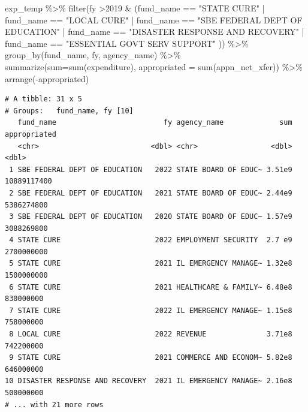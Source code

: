\documentclass[
  letterpaper,
  DIV=11,
  numbers=noendperiod]{scrreport}
\newenvironment{Shaded}{\begin{snugshade}}{\end{snugshade}}
\newcommand{\AttributeTok}[1]{\textcolor[rgb]{0.40,0.45,0.13}{#1}}
\newcommand{\DecValTok}[1]{\textcolor[rgb]{0.68,0.00,0.00}{#1}}
\newcommand{\FunctionTok}[1]{\textcolor[rgb]{0.28,0.35,0.67}{#1}}
\newcommand{\NormalTok}[1]{\textcolor[rgb]{0.00,0.23,0.31}{#1}}
\newcommand{\SpecialCharTok}[1]{\textcolor[rgb]{0.37,0.37,0.37}{#1}}
\newcommand{\StringTok}[1]{\textcolor[rgb]{0.13,0.47,0.30}{#1}}
\begin{document}
\begin{Shaded}
\begin{Highlighting}[]
\NormalTok{exp\_temp }\SpecialCharTok{\%\textgreater{}\%} \FunctionTok{filter}\NormalTok{(fy }\SpecialCharTok{\textgreater{}}\DecValTok{2019} \SpecialCharTok{\&}\NormalTok{ (fund\_name }\SpecialCharTok{==} \StringTok{"STATE CURE"} \SpecialCharTok{|}\NormalTok{ fund\_name }\SpecialCharTok{==} \StringTok{"LOCAL CURE"} \SpecialCharTok{|}\NormalTok{ fund\_name }\SpecialCharTok{==} \StringTok{"SBE FEDERAL DEPT OF EDUCATION"} \SpecialCharTok{|}\NormalTok{ fund\_name }\SpecialCharTok{==} \StringTok{"DISASTER RESPONSE AND RECOVERY"} \SpecialCharTok{|}\NormalTok{ fund\_name }\SpecialCharTok{==} \StringTok{"ESSENTIAL GOVT SERV SUPPORT"}\NormalTok{ )) }\SpecialCharTok{\%\textgreater{}\%} 
  \FunctionTok{group\_by}\NormalTok{(fund\_name, fy, agency\_name) }\SpecialCharTok{\%\textgreater{}\%} 
  \FunctionTok{summarize}\NormalTok{(}\AttributeTok{sum=}\FunctionTok{sum}\NormalTok{(expenditure),}
            \AttributeTok{appropriated =} \FunctionTok{sum}\NormalTok{(appn\_net\_xfer)) }\SpecialCharTok{\%\textgreater{}\%} 
  \FunctionTok{arrange}\NormalTok{(}\SpecialCharTok{{-}}\NormalTok{appropriated)}
\end{Highlighting}
\end{Shaded}

\begin{verbatim}
# A tibble: 31 x 5
# Groups:   fund_name, fy [10]
   fund_name                         fy agency_name             sum appropriated
   <chr>                          <dbl> <chr>                 <dbl>        <dbl>
 1 SBE FEDERAL DEPT OF EDUCATION   2022 STATE BOARD OF EDUC~ 3.51e9  10889117400
 2 SBE FEDERAL DEPT OF EDUCATION   2021 STATE BOARD OF EDUC~ 2.44e9   5386274800
 3 SBE FEDERAL DEPT OF EDUCATION   2020 STATE BOARD OF EDUC~ 1.57e9   3088269800
 4 STATE CURE                      2022 EMPLOYMENT SECURITY  2.7 e9   2700000000
 5 STATE CURE                      2021 IL EMERGENCY MANAGE~ 1.32e8   1500000000
 6 STATE CURE                      2021 HEALTHCARE & FAMILY~ 6.48e8    830000000
 7 STATE CURE                      2022 IL EMERGENCY MANAGE~ 1.15e8    758000000
 8 LOCAL CURE                      2022 REVENUE              3.71e8    742200000
 9 STATE CURE                      2021 COMMERCE AND ECONOM~ 5.82e8    646000000
10 DISASTER RESPONSE AND RECOVERY  2021 IL EMERGENCY MANAGE~ 2.16e8    500000000
# ... with 21 more rows
\end{verbatim}
\end{document}
